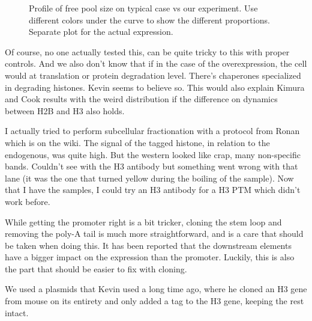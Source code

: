   \begin{figure}
    \centering
                 {Profile of free pool size on typical case vs our experiment. Use
                  different colors under the curve to show the different proportions.
                  Separate plot for the actual expression}.
    \label{fig:mess-histone-expression}
  \end{figure}
  
  Of course, no one actually tested this, can be quite tricky to this with proper controls. And we also
  don't know that if in the case of the overexpression, the cell would at translation or protein degradation
  level. There's chaperones specialized in degrading histones. Kevin seems to believe so. This would
  also explain Kimura and Cook results with the weird distribution if the difference on dynamics
  between H2B and H3 also holds.
  
  I actually tried to perform subcellular fractionation with a protocol from Ronan which is on the wiki.
  The signal of the tagged histone, in relation to the endogenous, was quite high. But the western
  looked like crap, many non-specific bands. Couldn't see with the H3 antibody but something went
  wrong with that lane (it was the one that turned yellow during the boiling of the sample). Now that
  I have the samples, I could try an H3 antibody for a H3 PTM which didn't work before.
  
  
  While getting the promoter right is a bit tricker, cloning the stem loop and removing the poly-A tail
  is much more straightforward, and is a care that should be taken when doing this. It has been reported
  that the downstream elements have a bigger impact on the expression than the promoter. Luckily, this
  is also the part that should be easier to fix with cloning.
  
  We used a plasmids that Kevin used a long time ago, where he cloned an H3 gene from mouse on its
  entirety and only added a tag to the H3 gene, keeping the rest intact.
  

